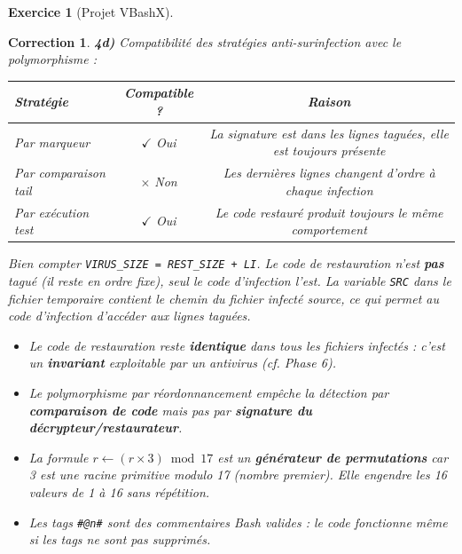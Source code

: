 \documentclass[a4paper,11pt]{article}
\theoremstyle{plain}
\newtheorem{correction}{Correction}
\theoremstyle{definition}
\newtheorem{exercice}{Exercice}
\begin{document}
\begin{exercice}[Projet VBashX]
\begin{correction}
\textbf{4d)} Compatibilité des stratégies anti-surinfection avec le polymorphisme :
\begin{center}
\begin{tabular}{lcc}
\toprule
\textbf{Stratégie} & \textbf{Compatible ?} & \textbf{Raison} \\
\midrule
Par marqueur & $\checkmark$ Oui & La signature est dans les lignes taguées, elle est toujours présente \\
Par comparaison tail & $\times$ Non & Les dernières lignes changent d'ordre à chaque infection \\
Par exécution test & $\checkmark$ Oui & Le code restauré produit toujours le même comportement \\
\bottomrule
\end{tabular}
\end{center}

\begin{attention}
Bien compter \texttt{VIRUS\_SIZE = REST\_SIZE + LI}. Le code de restauration n'est \textbf{pas} tagué (il reste en ordre fixe), seul le code d'infection l'est. La variable \texttt{SRC} dans le fichier temporaire contient le chemin du fichier infecté source, ce qui permet au code d'infection d'accéder aux lignes taguées.
\end{attention}

\begin{pointcle}
\begin{itemize}
    \item Le code de restauration reste \textbf{identique} dans tous les fichiers infectés : c'est un \textbf{invariant} exploitable par un antivirus (cf. Phase 6).
    \item Le polymorphisme par réordonnancement empêche la détection par \textbf{comparaison de code} mais pas par \textbf{signature du décrypteur/restaurateur}.
    \item La formule $r \leftarrow (r \times 3) \bmod 17$ est un \textbf{générateur de permutations} car 3 est une racine primitive modulo 17 (nombre premier). Elle engendre les 16 valeurs de 1 à 16 sans répétition.
    \item Les tags \texttt{\#@n\#} sont des commentaires Bash valides : le code fonctionne même si les tags ne sont pas supprimés.
\end{itemize}
\end{pointcle}

\end{correction}




\end{exercice}
\end{document}
